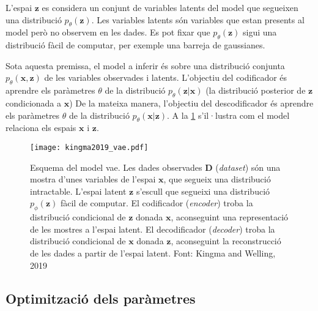 \documentclass[CAT,BIB]{TFUOC}%
\begin{document}
        L'espai $\mathbf{z}$ es considera un conjunt de variables latents del model
        que segueixen una distribució $p_\theta(\mathbf{z})$.
        Les variables latents són variables que estan presents al model però no observem en les dades.
        Es pot fixar que $p_\theta(\mathbf{z})$ sigui una distribució fàcil de computar,
        per exemple una barreja de gaussianes.

        Sota aquesta premissa,
        el model a inferir és sobre una distribució conjunta $p_\theta(\mathbf{x,z})$
        de les variables observades i latents.
        L'objectiu del codificador és aprendre els paràmetres $\theta$
        de la distribució $p_\theta(\mathbf{z|x})$
        (la distribució posterior de $\mathbf{z}$ condicionada a $\mathbf{x}$)
        De la mateixa manera,
        l'objectiu del descodificador és aprendre els paràmetres $\theta$
        de la distribució $p_\theta(\mathbf{x|z})$.
        A la \cref{fig:vae_kingma} s'il·lustra
        com el model relaciona els espais $\mathbf{x}$ i $\mathbf{z}$.

        \begin{figure}
            \centering
            \texttt{[image: kingma2019\_vae.pdf]}
            \caption{
                Esquema del model \gls{vae}.
                Les dades observades $\mathbf{D}$ (\textit{dataset})
                són una mostra d'unes variables de l'espai $\mathbf{x}$,
                que segueix una distribució intractable.
                L'espai latent $\mathbf{z}$ s'escull que segueixi
                una distribució $p_\phi(\mathbf{z})$ fàcil de computar.
                El codificador (\textit{encoder})
                troba la distribució condicional de $\mathbf{z}$ donada $\mathbf{x}$,
                aconseguint una representació de les mostres a l'espai latent.
                El decodificador (\textit{decoder})
                troba la distribució condicional de $\mathbf{x}$ donada $\mathbf{z}$,
                aconseguint la reconstrucció de les dades a partir de l'espai latent.
                Font: Kingma and Welling, 2019 \citep{Kingma2019}
            }
            \label{fig:vae_kingma}
        \end{figure}

    \subsection{Optimització dels paràmetres}
    \label{s:vae_optimitzacio}
\end{document}
